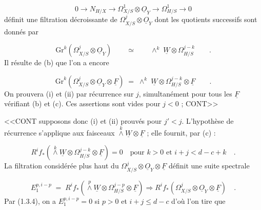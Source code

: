 \begin{equation}\tag{1.3.1}
0 \longrightarrow N_{H/X} \longrightarrow \Omega^1_{X/S} \otimes \underline{O}_Y \longrightarrow \Omega^1_{H/S} \longrightarrow 0
\end{equation}
définit une filtration décroissante de $\Omega^j_{X/S} \otimes \underline{O}_Y$ dont les quotients successifs sont donnés par

\begin{equation}\tag{1.3.2}
\mathrm{Gr}^k(\Omega^j_{X/S} \otimes \underline{O}_Y) \qquad \simeq \qquad \wedge^k \; \underline{W} \otimes \Omega^{j-k}_{H/S} \qquad .
\end{equation}
Il résulte de (b) que l'on a encore

\begin{equation}\tag{1.3.3}
\mathrm{Gr}^k(\Omega^j_{X/S} \otimes \underline{O}_Y \otimes \underline{F}) \;=\; \wedge^k \; \underline{W} \otimes \Omega^{j-k}_{H/S} \otimes \underline{F} \qquad .
\end{equation}
On prouvera (i) et (ii) par récurrence sur $j$, simultanément pour tous les $\underline{F}$ vérifiant (b) et (c). Ces assertions sont vides pour $j < 0$ ; CONT>>



<<CONT supposons donc (i) et (ii) prouvés pour $j' < j$. L'hypothèse de récurrence s'applique aux faisceaux $\stackrel{k}{\wedge} \underline{W} \otimes \underline{F}$ ; elle fournit, par (c) :

\begin{equation}\tag{1.3.4}
R^i f_* ( \stackrel{k}{\wedge}\underline{W} \otimes \Omega^{j-k}_{H/S} \otimes \underline{F}) = 0 \quad \mbox{pour } k > 0 \mbox{ et } i+j < d-c+k \quad .
\end{equation}
La filtration considérée plus haut du $\Omega^j_{X/S} \otimes \underline{O}_Y \otimes \underline{F}$ définit une suite spectrale

\begin{equation*}
E_1^{p,i-p} \; = \; R^i f_*( \stackrel{p}{\wedge} \underline{W} \otimes \Omega^{j-p}_{H/S} \otimes \underline{F}) \Longrightarrow R^i f_*(\Omega^j_{X/S} \otimes \underline{O}_Y \otimes \underline{F}) \quad .
\end{equation*}
Par (1.3.4), on a $E_1^{p,i-p} = 0$ si $p > 0$ et $i+j \leq d-c$ d'où l'on tire que

